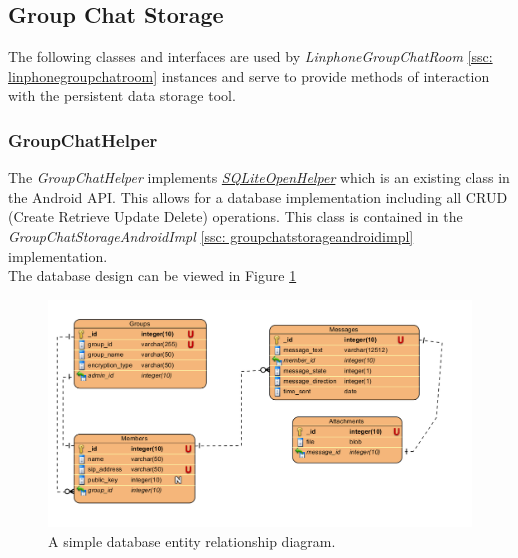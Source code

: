 \documentclass[11pt]{article}
\begin{document}
\subsection{Group Chat Storage}\label{subsec: groupchatstorage}
The following classes and interfaces are used by \textit{LinphoneGroupChatRoom} \ref{ssc: linphonegroupchatroom} instances and serve to provide methods of interaction with the persistent data storage tool.
\subsubsection{GroupChatHelper}\label{ssc: groupchathelper}
The \textit{GroupChatHelper} implements \hyperref{http://developer.android.com/reference/android/database/sqlite/SQLiteOpenHelper.html}{Documentation}{SQLiteOpenHelper Official Documentation}{\textit{SQLiteOpenHelper}} which is an existing class in the Android API. This allows for a database implementation including all CRUD (Create Retrieve Update Delete) operations. This class is contained in the \textit{GroupChatStorageAndroidImpl} \ref{ssc: groupchatstorageandroidimpl} implementation.\\
The database design can be viewed in Figure  \ref{cd-database-ERD}\\
\begin{figure}[H]
	\centering
	\includegraphics[width=5in]{./images/database_ERD.png}
	\caption[Database Entity Relationship Diagram]{A simple database entity relationship diagram.}
	\label{cd-database-ERD}
\end{figure}
\end{document}
